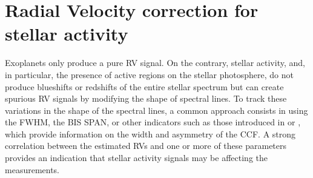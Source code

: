 \documentclass{aa}
\begin{document}
\section{Radial Velocity correction for stellar activity} \label{sec:31}

Exoplanets only produce a pure RV signal. On the contrary, stellar activity, and, in particular, the presence of active regions on the stellar photosphere, do not produce blueshifts or redshifts of the entire stellar spectrum but can create spurious RV signals by modifying the shape of spectral lines.
To track these variations in the shape of the spectral lines, a common approach consists in using the FWHM, the BIS SPAN, or other indicators such as those introduced in \citet{Boisse-2011} or \citet{Figueira-2013}, which provide information on the width and asymmetry of the CCF. A strong correlation between the estimated RVs and one or more of these parameters provides an indication that stellar activity signals may be affecting the measurements.
\end{document}
